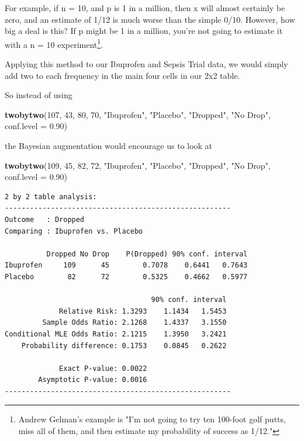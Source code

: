 \documentclass[
]{book}
\newenvironment{Shaded}{\begin{snugshade}}{\end{snugshade}}
\newcommand{\DataTypeTok}[1]{\textcolor[rgb]{0.13,0.29,0.53}{#1}}
\newcommand{\DecValTok}[1]{\textcolor[rgb]{0.00,0.00,0.81}{#1}}
\newcommand{\FloatTok}[1]{\textcolor[rgb]{0.00,0.00,0.81}{#1}}
\newcommand{\KeywordTok}[1]{\textcolor[rgb]{0.13,0.29,0.53}{\textbf{#1}}}
\newcommand{\NormalTok}[1]{#1}
\newcommand{\StringTok}[1]{\textcolor[rgb]{0.31,0.60,0.02}{#1}}
\begin{document}
For example, if n = 10, and p is 1 in a million, then x will almost certainly be zero, and an estimate of 1/12 is much worse than the simple 0/10. However, how big a deal is this? If p might be 1 in a million, you're not going to estimate it with a n = 10 experiment\footnote{Andrew Gelman's example is "I'm not going to try ten 100-foot golf putts, miss all of them, and then estimate my probability of success as 1/12."}.

Applying this method to our Ibuprofen and Sepsis Trial data, we would simply add two to each frequency in the main four cells in our 2x2 table.

So instead of using

\begin{Shaded}
\begin{Highlighting}[]
\KeywordTok{twobytwo}\NormalTok{(}\DecValTok{107}\NormalTok{, }\DecValTok{43}\NormalTok{, }\DecValTok{80}\NormalTok{, }\DecValTok{70}\NormalTok{, }
         \StringTok{"Ibuprofen"}\NormalTok{, }\StringTok{"Placebo"}\NormalTok{, }\StringTok{"Dropped"}\NormalTok{, }\StringTok{"No Drop"}\NormalTok{,}
         \DataTypeTok{conf.level =} \FloatTok{0.90}\NormalTok{)}
\end{Highlighting}
\end{Shaded}

the Bayesian augmentation would encourage us to look at

\begin{Shaded}
\begin{Highlighting}[]
\KeywordTok{twobytwo}\NormalTok{(}\DecValTok{109}\NormalTok{, }\DecValTok{45}\NormalTok{, }\DecValTok{82}\NormalTok{, }\DecValTok{72}\NormalTok{, }
         \StringTok{"Ibuprofen"}\NormalTok{, }\StringTok{"Placebo"}\NormalTok{, }\StringTok{"Dropped"}\NormalTok{, }\StringTok{"No Drop"}\NormalTok{,}
         \DataTypeTok{conf.level =} \FloatTok{0.90}\NormalTok{)}
\end{Highlighting}
\end{Shaded}

\begin{verbatim}
2 by 2 table analysis: 
------------------------------------------------------ 
Outcome   : Dropped 
Comparing : Ibuprofen vs. Placebo 

          Dropped No Drop    P(Dropped) 90% conf. interval
Ibuprofen     109      45        0.7078    0.6441   0.7643
Placebo        82      72        0.5325    0.4662   0.5977

                                   90% conf. interval
             Relative Risk: 1.3293    1.1434   1.5453
         Sample Odds Ratio: 2.1268    1.4337   3.1550
Conditional MLE Odds Ratio: 2.1215    1.3950   3.2421
    Probability difference: 0.1753    0.0845   0.2622

             Exact P-value: 0.0022 
        Asymptotic P-value: 0.0016 
------------------------------------------------------
\end{verbatim}
\end{document}
